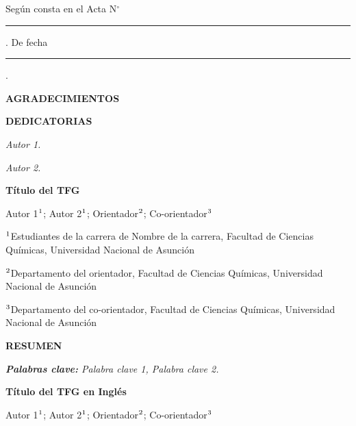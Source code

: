\documentclass[11pt,oneside,a4paper]{book}
\begin{document}
Según consta en el Acta N$^{\circ}$ \rule{2cm}{1pt}. De fecha \rule{2cm}{1pt}.


\newpage
\thispagestyle{plain}
\begin{center}
\textbf{AGRADECIMIENTOS}
\end{center}
\vspace{1cm}

\lipsum[1]

\newpage
\thispagestyle{plain}
\begin{center}
\textbf{DEDICATORIAS}
\end{center}
\vspace{1cm}

\lipsum[1]

\hfill \textit{Autor 1.}

\lipsum[2]

\hfill \textit{Autor 2.}

\newpage
\thispagestyle{plain}
\large
\begin{center}
\textbf{{Título del TFG}}
\end{center}

\begin{center}
Autor 1$^{\textnormal{1}}$; Autor 2$^{\textnormal{1}}$; Orientador$^{\textnormal{2}}$; Co-orientador$^{\textnormal{3}}$
\end{center}


$^{\textnormal{1}}$Estudiantes de la carrera de Nombre de la carrera, Facultad de Ciencias Químicas, Universidad Nacional de Asunción

$^{\textnormal{2}}$Departamento del orientador, Facultad de Ciencias Químicas, Universidad Nacional de Asunción

$^{\textnormal{3}}$Departamento del co-orientador, Facultad de Ciencias Químicas, Universidad Nacional de Asunción



\begin{center}
    \textbf{RESUMEN}
\end{center}


\noindent 
\lipsum[1]


\textit{\textbf{Palabras clave:} Palabra clave 1, Palabra clave 2.}


\newpage
\thispagestyle{plain}
\begin{center}
\large{\textbf{Título del TFG en Inglés}}\\
\end{center}
\large
\begin{center}
Autor 1$^{\textnormal{1}}$; Autor 2$^{\textnormal{1}}$; Orientador$^{\textnormal{2}}$; Co-orientador$^{\textnormal{3}}$
\end{center}
\end{document}
